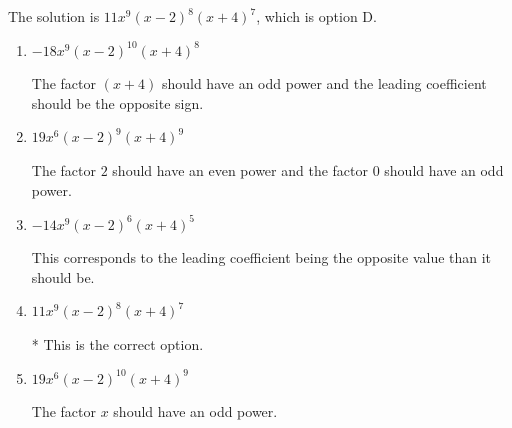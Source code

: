 \documentclass{extbook}[14pt]
\begin{document}
\begin{enumerate}
{The solution is \( 11x^{9} (x - 2)^{8} (x + 4)^{7} \), which is option D.\begin{enumerate}[label=\Alph*.]
\item \( -18x^{9} (x - 2)^{10} (x + 4)^{8} \)

The factor $(x + 4)$ should have an odd power and the leading coefficient should be the opposite sign.
\item \( 19x^{6} (x - 2)^{9} (x + 4)^{9} \)

The factor $2$ should have an even power and the factor $0$ should have an odd power.
\item \( -14x^{9} (x - 2)^{6} (x + 4)^{5} \)

This corresponds to the leading coefficient being the opposite value than it should be.
\item \( 11x^{9} (x - 2)^{8} (x + 4)^{7} \)

* This is the correct option.
\item \( 19x^{6} (x - 2)^{10} (x + 4)^{9} \)

The factor $x$ should have an odd power.
\end{enumerate}

}
\end{enumerate}
\end{document}
